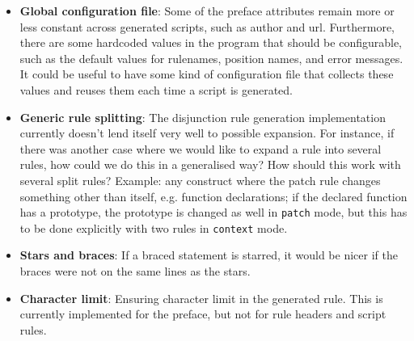 \begin{itemize}
\item \textbf{Global configuration file}: Some of the preface attributes remain more or less constant across generated scripts, such as author and url. Furthermore, there are some hardcoded values in the program that should be configurable, such as the default values for rulenames, position names, and error messages.\newline
It could be useful to have some kind of configuration file that collects these values and reuses them each time a script is generated.
\item \textbf{Generic rule splitting}: The disjunction rule generation implementation currently doesn't lend itself very well to possible expansion. For instance, if there was another case where we would like to expand a rule into several rules, how could we do this in a generalised way? How should this work with several split rules?\newline
Example: any construct where the patch rule changes something other than itself, e.g. function declarations; if the declared function has a prototype, the prototype is changed as well in \texttt{patch} mode, but this has to be done explicitly with two rules in \texttt{context} mode.
\item \textbf{Stars and braces}: If a braced statement is starred, it would be nicer if the braces were not on the same lines as the stars.
\item \textbf{Character limit}: Ensuring character limit in the generated rule. This is currently implemented for the preface, but not for rule headers and script rules.
\end{itemize}
